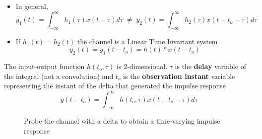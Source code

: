 \documentclass[xcolor=dvipsnames,aspectratio=169]{beamer}
\begin{document}
{    \begin{itemize}    
     \item In general, 
     $$y_1(t)=\int_{-\infty}^{\infty}h_1(\tau)x(t-\tau)d\tau\;\neq\;y_2(t)=\int_{-\infty}^{\infty}h_2(\tau)x(t-t_o-\tau)d\tau$$
     \item If $h_1(t)=h_2(t)$ the channel is a Linear Time Invariant system
     $$y_2(t)=y_1(t-t_o)=h(t)*x(t-t_o)$$
     \end{itemize}
     \begin{definition}
      The input-output function $h(t_o,\tau)$ is 2-dimensional. $\tau$ is the \textbf{delay} variable of the integral (not a convolution) and $t_o$ is the \textbf{observation instant} variable representing the instant of the delta that generated the impulse response
     $$y(t-t_o)=\int_{-\infty}^{\infty}h(t_o,\tau)x(t-t_o-\tau)d\tau$$
     \end{definition}
     
     
 \begin{figure}
    \centering
    \caption{Probe the channel with a delta to obtain a time-varying impulse response}
    \end{figure}
}
\end{document}
